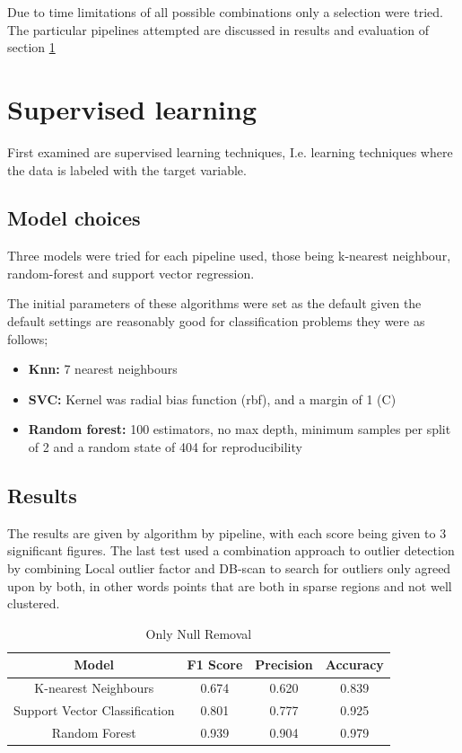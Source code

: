 \documentclass[a4paper]{article}
\begin{document}
Due to time limitations of all possible combinations only a selection were tried. The particular pipelines attempted are discussed in results and evaluation of section \ref{learning}

\section{Supervised learning}\label{learning}

First examined are supervised learning techniques, I.e. learning techniques where the data is labeled with the target variable.

\subsection{Model choices}

Three models were tried for each pipeline used, those being k-nearest neighbour, random-forest and support vector regression. 

The initial parameters of these algorithms were set as the default given the default settings are reasonably good for classification problems they were as follows;
\begin{itemize}
    \item \textbf{Knn:} 7 nearest neighbours
    \item \textbf{SVC:} Kernel was radial bias function (rbf), and a margin of 1 (C)
    \item \textbf{Random forest:} 100 estimators, no max depth, minimum samples per split of 2 and a random state of 404 for reproducibility
\end{itemize}

\subsection{Results}

The results are given by algorithm by pipeline, with each score being given to 3 significant figures. The last test used a combination approach to outlier detection by combining Local outlier factor and DB-scan to search for outliers only agreed upon by both, in other words points that are both in sparse regions and not well clustered.

\begin{table}[H]
    \centering
    \begin{tabular}{|c|c|c|c|}
    \hline
         Model & F1 Score  & Precision  & Accuracy  \\
    \hline
        K-nearest Neighbours & 0.674 & 0.620 & 0.839 \\
    \hline
        Support Vector Classification & 0.801 & 0.777 & 0.925 \\
    \hline
        Random Forest & 0.939 & 0.904 & 0.979 \\
    \hline
    \end{tabular}
    \caption{Only Null Removal}
    \label{tab:my_label}
\end{table}
\end{document}
